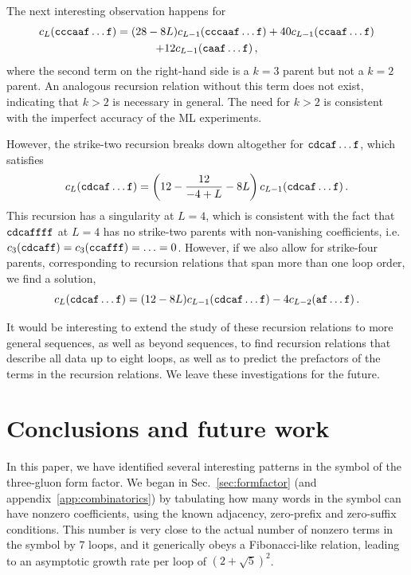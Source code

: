 \documentclass[12pt]{article}
\begin{document}
The next interesting observation happens for 
\begin{multline}
    c_L({\tt cccaaf\dots f}) = (28 - 8 L) c_{L-1}({\tt cccaaf\dots f}) + 40 c_{L-1}({\tt ccaaf\dots f}) \\+ 12 c_{L-1}({\tt caaf\dots f})\,,
\end{multline}
where the second term on the right-hand side is a $k=3$ parent but not a $k=2$ parent. An analogous recursion relation without this term does not exist, indicating that $k>2$ is necessary in general.
The need for $k>2$ is consistent with the imperfect accuracy of the ML experiments.

However, the strike-two recursion breaks down altogether for ${\tt cdcaf\dots f}$, which satisfies
\begin{equation}
 c_L({\tt cdcaf\dots f}) =   \left( 12 - \frac{12}{-4 + L} - 8 L\right) c_{L-1}({\tt cdcaf\dots f})\,.
\end{equation}
This recursion has a singularity at $L=4$, which is consistent with the fact that ${\tt cdcaffff}$ at $L=4$ has no strike-two parents with non-vanishing coefficients, i.e.~$c_3({\tt cdcaff}) = c_3({\tt ccafff}) = \ldots = 0$.
However, if we also allow for strike-four parents, corresponding to recursion relations that span more than one loop order, we find a solution,
\begin{equation}
    c_L({\tt cdcaf\dots f}) = (12 - 8 L) c_{L-1}({\tt cdcaf\dots f})   - 4 c_{L-2}({\tt af\dots f})\,.
\end{equation}

It would be interesting to extend the study of these recursion relations to more general sequences, as well as beyond sequences, to find recursion relations that describe all data up to eight loops, as well as to predict the prefactors of the terms in the recursion relations.
We leave these investigations for the future.



\section{Conclusions and future work} \label{sec:conclusions}



In this paper, we have identified several interesting patterns in the symbol of the three-gluon form factor.  We began in Sec.~\ref{sec:formfactor} (and appendix~\ref{app:combinatorics}) by tabulating how many words in the symbol can have nonzero coefficients, using the known adjacency, zero-prefix and zero-suffix conditions. This number is very close to the actual number of nonzero terms in the symbol by 7 loops, and it generically obeys a Fibonacci-like relation, leading to an asymptotic growth rate per loop of $(2+\sqrt{5})^2$.  
\end{document}
